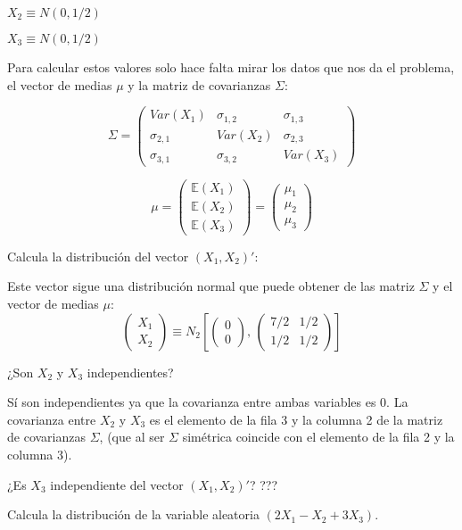 \documentclass[nochap]{apuntes}
\begin{document}
$X_2\equiv N(0, 1/2)$

$X_3\equiv N(0, 1/2)$

Para calcular estos valores solo hace falta mirar los datos que nos da el problema, el vector de medias $\mu$ y la matriz de covarianzas $\Sigma$:

\[
\Sigma=\left(
\begin{array}{ccc}
Var(X_1)& \sigma_{1,2}& \sigma_{1,3} \\
\sigma_{2,1}& Var(X_2)& \sigma_{2,3} \\
\sigma_{3,1}& \sigma_{3,2}& Var(X_3)
\end{array}
\right)
\]

\[
\mu=
\left(
\begin{array}{c}
\mathbb{E}(X_1)\\
\mathbb{E}(X_2)\\
\mathbb{E}(X_3)
\end{array}
\right)=
\left(
\begin{array}{c}
\mu_1\\
\mu_2\\
\mu_3
\end{array}
\right)
\]

\ppart Calcula la distribución del vector $(X_1,X_2)'$:

Este vector sigue una distribución normal que puede obtener de las matriz $\Sigma$ y el vector de medias $\mu$:
\[
\left(
\begin{array}{c}
X_1\\
X_2
\end{array}
\right)
\equiv N_2\left[
\left(
\begin{array}{c}
0\\
0
\end{array}
\right)
\text{, }
\left(
\begin{array}{cc}
7/2& 1/2 \\
1/2 & 1/2
\end{array}
\right)
\right] 
\]

\ppart ¿Son $X_2$ y $X_3$ independientes?

Sí son independientes ya que la covarianza entre ambas variables es 0. La covarianza entre $X_2$ y $X_3$ es el elemento de la fila 3 y la columna 2 de la matriz de covarianzas $\Sigma$, (que al ser $\Sigma$ simétrica coincide con el elemento de la fila 2 y la columna 3).

\ppart ¿Es $X_3$ independiente del vector $(X_1, X_2)'$?
???

\ppart Calcula la  distribución de la variable aleatoria $(2X_1-X_2+3X_3)$.
\end{document}

